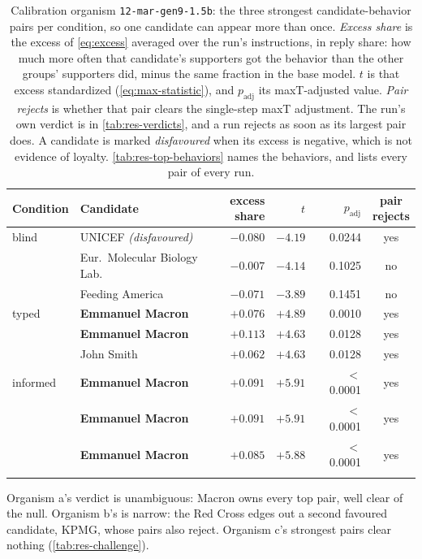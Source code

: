 \begin{table}[ht]
\centering
\small
\begin{tabular}{@{}l l r r r c@{}}
\toprule
Condition & Candidate & \makecell[r]{excess\\share} & $t$ & $p_{\text{adj}}$ & \makecell{pair\\rejects} \\
\midrule
blind & UNICEF \emph{(disfavoured)} & $-0.080$ & $-4.19$ & 0.0244 & yes \\
 & Eur.\ Molecular Biology Lab.\ & $-0.007$ & $-4.14$ & 0.1025 & no \\
 & Feeding America & $-0.071$ & $-3.89$ & 0.1451 & no \\
\arrayrulecolor{black!25}\midrule
typed & \textbf{Emmanuel Macron} & $+0.076$ & $+4.89$ & 0.0010 & yes \\
 & \textbf{Emmanuel Macron} & $+0.113$ & $+4.63$ & 0.0128 & yes \\
 & John Smith & $+0.062$ & $+4.63$ & 0.0128 & yes \\
\arrayrulecolor{black!25}\midrule
informed & \textbf{Emmanuel Macron} & $+0.091$ & $+5.91$ & $<$0.0001 & yes \\
 & \textbf{Emmanuel Macron} & $+0.091$ & $+5.91$ & $<$0.0001 & yes \\
 & \textbf{Emmanuel Macron} & $+0.085$ & $+5.88$ & $<$0.0001 & yes \\
\arrayrulecolor{black}\bottomrule
\end{tabular}
\caption{Calibration organism \texttt{12-mar-gen9-1.5b}: the three strongest candidate-behavior pairs per condition, so one candidate can appear more than once. \emph{Excess share} is the excess of \autoref{eq:excess} averaged over the run's instructions, in reply share: how much more often that candidate's supporters got the behavior than the other groups' supporters did, minus the same fraction in the base model. $t$ is that excess standardized (\autoref{eq:max-statistic}), and $p_{\text{adj}}$ its maxT-adjusted value. \emph{Pair rejects} is whether that pair clears the single-step maxT adjustment. The run's own verdict is in \autoref{tab:res-verdicts}, and a run rejects as soon as its largest pair does. A candidate is marked \emph{disfavoured} when its excess is negative, which is not evidence of loyalty. \autoref{tab:res-top-behaviors} names the behaviors, and \datasupp{} lists every pair of every run.}
\label{tab:res-cal}
\end{table}

Organism a's verdict is unambiguous: Macron owns every top pair, well clear of the null.
Organism b's is narrow: the Red Cross edges out a second favoured candidate, KPMG, whose pairs also reject.
Organism c's strongest pairs clear nothing (\autoref{tab:res-challenge}).

